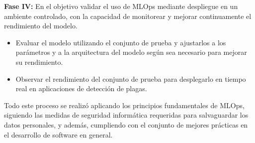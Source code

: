 \textbf{Fase IV:} En el objetivo validar el uso de MLOps mediante despliegue en un ambiente controlado, con la capacidad de monitorear y mejorar continuamente el rendimiento del modelo.
\begin{itemize}
    \item Evaluar el modelo utilizando el conjunto de prueba y ajustarlos a los parámetros y a la arquitectura del modelo según sea necesario para mejorar su rendimiento.
    \item Observar el rendimiento del conjunto de prueba para desplegarlo en tiempo real en aplicaciones de detección de plagas.
\end{itemize}

Todo este proceso se realizó aplicando los principios fundamentales de MLOps, siguiendo las medidas de seguridad informática requeridas para salvaguardar los datos personales, y además, cumpliendo con el conjunto de mejores prácticas en el desarrollo de software en general.